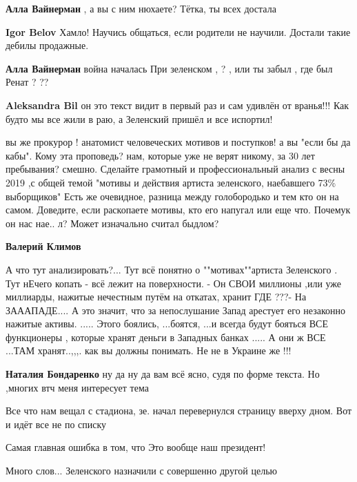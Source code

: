\begin{itemize}
\begin{itemize}
\textbf{Алла Вайнерман} , а вы с ним нюхаете? Тётка, ты всех достала


\textbf{Igor Belov}
Хамло! Научись общаться, если родители не научили. Достали такие дебилы продажные.

\textbf{Алла Вайнерман} война началась При зеленском , ? , или ты забыл , где был Ренат ? ??

\textbf{Aleksandra Bil} он это текст видит в первый раз и сам удивлён от вранья!!! Как будто мы все жили в раю, а Зеленский пришёл и все испортил!
\end{itemize} %


вы же прокурор ! анатомист человеческих мотивов и поступков! а вы "если бы да
кабы". Кому эта проповедь? нам, которые уже не верят никому, за 30 лет
пребывания? смешно. Сделайте грамотный и профессиональный анализ с весны 2019
,с общей темой "мотивы и действия артиста зеленского, наебавшего 73\%
выборщиков" Есть же очевидное, разница между голобородько и тем кто он на
самом. Доведите, если раскопаете мотивы, кто его напугал или еще что. Почемук он
нас нае.. л? Может изначально считал быдлом?

\begin{itemize} %
\textbf{Валерий Климов} 

А что тут анализировать?... Тут всё понятно о ""мотивах""артиста Зеленского .
Тут нЕчего копать - всё лежит на поверхности. - Он СВОИ миллионы ,или
уже миллиарды, нажитые нечестным путём на откатах, хранит ГДЕ ???- На
ЗАААПАДЕ.... А это значит, что за непослушание Запад арестует его незаконно
нажитые активы. ..... Этого боялись, ...боятся, ...и всегда будут бояться ВСЕ
функционеры , которые хранят деньги в Западных банках ..... А они ж ВСЕ ...ТАМ
хранят..,,,. как вы должны понимать. Не не в Украине же !!!


\textbf{Наталия Бондаренко} ну да ну да вам всё ясно, судя по форме текста. Но ,многих втч меня интересует тема
\end{itemize} %

Все что нам вещал с стадиона, зе. начал перевернулся страницу вверху дном. Вот и идёт все не по списку

Самая главная ошибка в том, что Это вообще наш президент!

Много слов...
Зеленского назначили с совершенно другой целью


\end{itemize}
